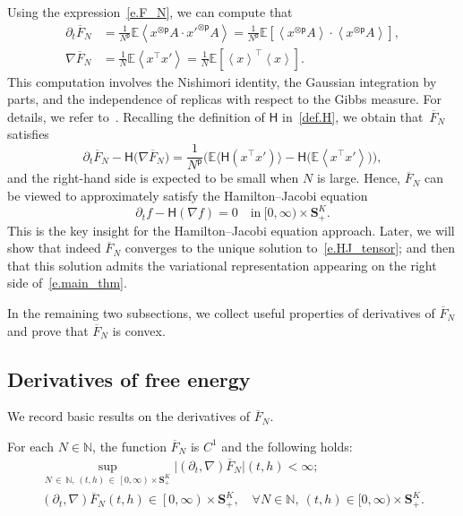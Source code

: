 \documentclass[AHL,Unicode,longabstracts,published]{cedram}
\newcommand{\N}{\mathbb{N}}
\newcommand{\E}{\mathbb{E}}
\renewcommand{\S}{\mathbf{S}}
\renewcommand{\H}{\mathsf{H}}
\newcommand{\sfp}{\mathsf{p}}
\renewcommand{\bar}{\overline}
\newcommand{\dr}{\partial}
\newcommand{\la}{\left\langle}
\newcommand{\ra}{\right\rangle}
\let\oldforall\forall
\renewcommand*{\forall}{\mathrel{\oldforall}}
\begin{document}
Using the expression~\eqref{e.F_N}, we can compute that
\begin{align}
\dr_t \bar F_N &= \frac{1}{N^{\sfp}} \E \la x^{\otimes \sfp}A \cdot x'^{\otimes\sfp} A \ra=\frac{1}{N^{\sfp}} \E\left[\la x^{\otimes \sfp}A \ra \cdot \la x^{\otimes\sfp} A \ra\right],\label{e.dt_F_N}
\\
\nabla \bar F_N &= \frac 1 N \E \la x^\intercal x' \ra = \frac{1}{N}\E\left[\la x \ra^\intercal \la x \ra\right].\label{e.grad_F_N}
\end{align}
This computation involves the Nishimori identity, the Gaussian integration by parts, and the independence of replicas with respect to the Gibbs measure. For details, we refer to~\cite[(3.5)-(3.6)]{HBJ}. Recalling the definition of $\H$ in~\eqref{def.H}, we obtain that~$\bar F_N$ satisfies
\begin{equation*}
\partial_t \bar F_N - \H\big(\nabla \bar F_N\big) = \frac{1}{N^\sfp}\bigg(\E\big\langle\H\left(x^\intercal x'\right) \big\rangle - \H\big(\E\left\langle x^\intercal x'\right\rangle \big)\bigg),
\end{equation*}
and the right-hand side is expected to be small when $N$ is large. Hence, $\bar F_N$ can be viewed to approximately satisfy the Hamilton--Jacobi equation
\begin{equation}\label{e.HJ_tensor}
\partial_t f - \H(\nabla f)=0 \quad\text{in}\ [0,\infty)\times \S^K_+.
\end{equation}
This is the key insight for the Hamilton--Jacobi equation approach. Later, we will show that indeed $\bar F_N$ converges to the unique solution to~\eqref{e.HJ_tensor}; and then that this solution admits the variational representation appearing on the right side of~\eqref{e.main_thm}.


In the remaining two subsections, we collect useful properties of derivatives of $\bar F_N$ and prove that $\bar F_N$ is convex.


\subsection{Derivatives of free energy}

We record basic results on the derivatives of $\bar F_N$.

\begin{lemm}\label{l.lip_unif_N}
For each $N\in\N$, the function $\bar F_N$ is $C^1$ and the following holds:
\begin{gather*}
\sup_{N\,\in\,\N,\, (t,h)\,\in\, \left[0,\infty\right)\times \S^K_+}\big|\left(\partial_t, \nabla\right)\bar F_N\big|(t,h)<\infty;\\
\left(\partial_t, \nabla\right)\bar F_N(t,h)\in \left[0,\infty\right)\times \S^K_+,\quad\forall N\in\N,\ (t,h)\in [0,\infty)\times \S^K_+.
\end{gather*}
\end{lemm}
\end{document}
